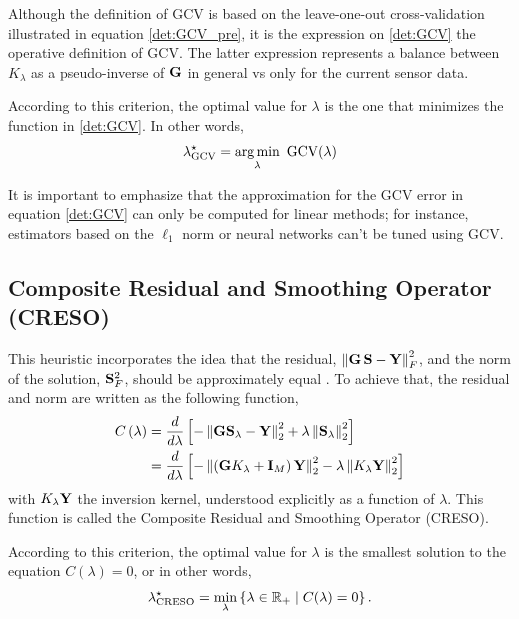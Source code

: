 Although the definition of GCV is based on the leave-one-out cross-validation illustrated in equation \eqref{det:GCV_pre}, it is the expression on \eqref{det:GCV} the operative definition of GCV.
%
The latter expression represents a balance between $K_\lambda$ as a pseudo-inverse of $\mathbf{G}$ in general vs only for the current sensor data.

According to this criterion, the optimal value for $\lambda$ is the one that minimizes the function in \eqref{det:GCV}.
In other words,
\begin{equation}
    \lambda^\star_\text{GCV} = 
    \operatorname*{arg\,min}_\lambda\,\, \text{GCV}(\lambda)
\end{equation}

It is important to emphasize that the approximation for the GCV error in equation \eqref{det:GCV} can only be computed for linear methods; for instance, estimators based on the $\ell_1$ norm or neural networks can't be tuned using GCV.

\subsection{Composite Residual and Smoothing Operator (CRESO)}

This heuristic incorporates the idea that the residual, $\left\lVert \mathbf{G}\, \mathbf{S} - \mathbf{Y} \right\rVert_F^2$, and the norm of the solution, $\mathbf{S}_F^2$, should be approximately equal \cite{creso}.
%
To achieve that, the residual and norm are written as the following function, 
\begin{align}
    C\left( \lambda \right) &= 
\frac{d}{d\lambda} \left[  -\left\lVert \mathbf{G}\mathbf{S}_\lambda - \mathbf{Y} \right\rVert_2^2 + \lambda \left\lVert \mathbf{S}_\lambda \right\rVert_2^2 \right]
\nonumber \\
&=
\frac{d}{d\lambda} \left[  - \left\lVert \left( \mathbf{G} K_\lambda + \mathbf{I}_M \right)\mathbf{Y} \right\rVert_2^2 - \lambda \left\lVert K_\lambda \mathbf{Y} \right\rVert_2^2 \right]
\end{align}
with $K_\lambda \mathbf{Y}$ the inversion kernel, understood explicitly as a function of $\lambda$. 
%
This function is called the Composite Residual and Smoothing Operator (CRESO).

According to this criterion, the optimal value for $\lambda$ is the smallest solution to the equation $C(\lambda)=0$, or in other words,
\begin{equation}
    \lambda^\star_\text{CRESO} = 
    \min_\lambda \left\{ \lambda\in \mathbb{R}_+ \;\middle|\; C(\lambda)=0 \right\}.
\end{equation}

